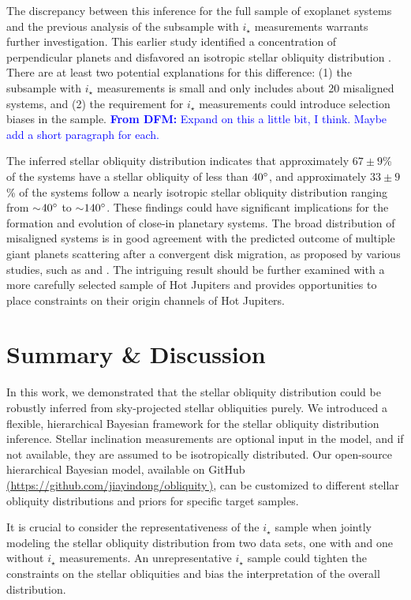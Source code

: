 \documentclass[twocolumn,times]{aastex631}
\newcommand{\dfm}[1]{\textcolor{blue}{\textbf{From DFM:} #1}}
\begin{document}
The discrepancy between this inference for the full sample of exoplanet systems and the previous analysis of the subsample with $i_\star$ measurements \citep{Albrecht21} warrants further investigation.
This earlier study identified a concentration of perpendicular planets and disfavored an isotropic stellar obliquity distribution \citep{Albrecht21}.
There are at least two potential explanations for this difference: (1) the subsample with $i_\star$ measurements is small and only includes about 20 misaligned systems, and (2) the requirement for $i_\star$ measurements could introduce selection biases in the sample.  \dfm{Expand on this a little bit, I think. Maybe add a short paragraph for each.}

The inferred stellar obliquity distribution indicates that approximately $67\pm9$\% of the systems have a stellar obliquity of less than $40\mbox{$^\circ$}$, and approximately $33\pm9$\% of the systems follow a nearly isotropic stellar obliquity distribution ranging from $\sim$$40\mbox{$^\circ$}$ to $\sim$$140\mbox{$^\circ$}$. These findings could have significant implications for the formation and evolution of close-in planetary systems.
The broad distribution of misaligned systems is in good agreement with the predicted outcome of multiple giant planets scattering after a convergent disk migration, as proposed by various studies, such as \cite{Nagasawa11} and \cite{Beague12}. The intriguing result should be further examined with a more carefully selected sample of Hot Jupiters and provides opportunities to place constraints on their origin channels of Hot Jupiters.

\section{Summary \& Discussion}

In this work, we demonstrated that the stellar obliquity distribution could be robustly inferred from sky-projected stellar obliquities purely.
We introduced a flexible, hierarchical Bayesian framework for the stellar obliquity distribution inference. Stellar inclination measurements are optional input in the model, and if not available, they are assumed to be isotropically distributed.
Our open-source hierarchical Bayesian model, available on GitHub \href{https://github.com/jiayindong/obliquity}{(https://github.com/jiayindong/obliquity\,\faGithub)}, can be customized to different stellar obliquity distributions and priors for specific target samples.

It is crucial to consider the representativeness of the $i_\star$ sample when jointly modeling the stellar obliquity distribution from two data sets, one with and one without $i_\star$ measurements. An unrepresentative $i_\star$ sample could tighten the constraints on the stellar obliquities and bias the interpretation of the overall distribution.
\end{document}
